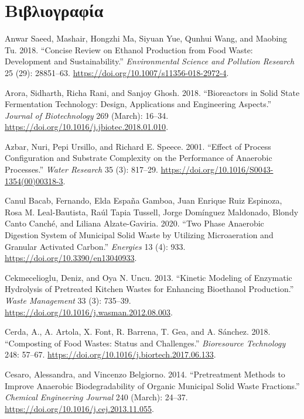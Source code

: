 \documentclass[11pt]{report}
\begin{document}
\part*{Βιβλιογραφία}
\label{sec:org92f46fa}
\begin{hangparas}{1.5em}{1}
\hypertarget{citeproc_bib_item_1}{Anwar Saeed, Mashair, Hongzhi Ma, Siyuan Yue, Qunhui Wang, and Maobing Tu. 2018. “Concise Review on Ethanol Production from Food Waste: Development and Sustainability.” \textit{Environmental Science and Pollution Research} 25 (29): 28851–63. \url{https://doi.org/10.1007/s11356-018-2972-4}.}

\hypertarget{citeproc_bib_item_2}{Arora, Sidharth, Richa Rani, and Sanjoy Ghosh. 2018. “Bioreactors in Solid State Fermentation Technology: Design, Applications and Engineering Aspects.” \textit{Journal of Biotechnology} 269 (March): 16–34. \url{https://doi.org/10.1016/j.jbiotec.2018.01.010}.}

\hypertarget{citeproc_bib_item_3}{Azbar, Nuri, Pepi Ursillo, and Richard E. Speece. 2001. “Effect of Process Configuration and Substrate Complexity on the Performance of Anaerobic Processes.” \textit{Water Research} 35 (3): 817–29. \url{https://doi.org/10.1016/S0043-1354(00)00318-3}.}

\hypertarget{citeproc_bib_item_4}{Canul Bacab, Fernando, Elda España Gamboa, Juan Enrique Ruiz Espinoza, Rosa M. Leal-Bautista, Raúl Tapia Tussell, Jorge Domínguez Maldonado, Blondy Canto Canché, and Liliana Alzate-Gaviria. 2020. “Two Phase Anaerobic Digestion System of Municipal Solid Waste by Utilizing Microaeration and Granular Activated Carbon.” \textit{Energies} 13 (4): 933. \url{https://doi.org/10.3390/en13040933}.}

\hypertarget{citeproc_bib_item_5}{Cekmecelioglu, Deniz, and Oya N. Uncu. 2013. “Kinetic Modeling of Enzymatic Hydrolysis of Pretreated Kitchen Wastes for Enhancing Bioethanol Production.” \textit{Waste Management} 33 (3): 735–39. \url{https://doi.org/10.1016/j.wasman.2012.08.003}.}

\hypertarget{citeproc_bib_item_6}{Cerda, A., A. Artola, X. Font, R. Barrena, T. Gea, and A. Sánchez. 2018. “Composting of Food Wastes: Status and Challenges.” \textit{Bioresource Technology} 248: 57–67. \url{https://doi.org/10.1016/j.biortech.2017.06.133}.}

\hypertarget{citeproc_bib_item_7}{Cesaro, Alessandra, and Vincenzo Belgiorno. 2014. “Pretreatment Methods to Improve Anaerobic Biodegradability of Organic Municipal Solid Waste Fractions.” \textit{Chemical Engineering Journal} 240 (March): 24–37. \url{https://doi.org/10.1016/j.cej.2013.11.055}.}


\end{hangparas}
\end{document}

